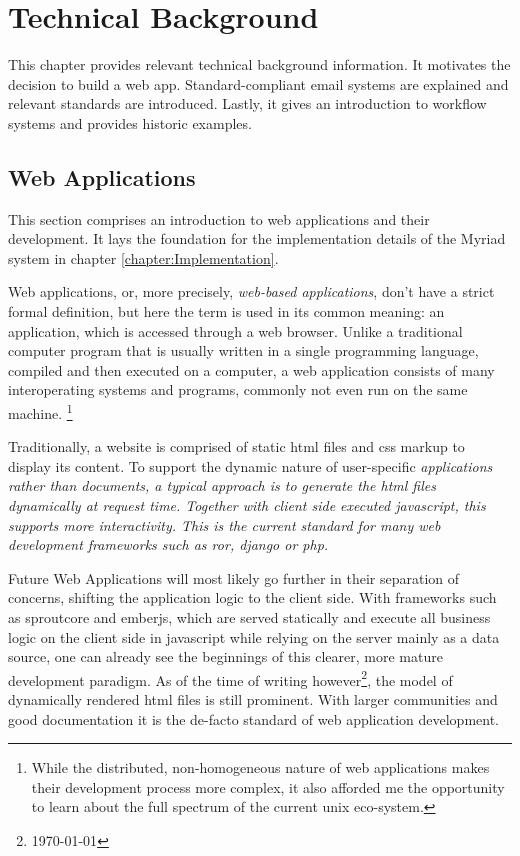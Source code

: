 \chapter{Technical Background}
\label{chapter:Technical}

This chapter provides relevant technical background information. It motivates the decision to build a web app. Standard-compliant email systems are explained and relevant standards are introduced. Lastly, it gives an introduction to workflow systems and provides historic examples.

\section{Web Applications}

This section comprises an introduction to web applications and their development. It lays the foundation for the implementation details of the Myriad system in chapter \autoref{chapter:Implementation}.

Web applications, or, more precisely, \emph{web-based applications}, don't have a strict formal definition, but here the term is used in its common meaning\cite{webapptrends}: an application, which is accessed through a web browser. Unlike a traditional computer program that is usually written in a single programming language, compiled and then executed on a computer, a web application consists of many interoperating systems and programs, commonly not even run on the same machine. \footnote{While the distributed, non-homogeneous nature of web applications makes their development process more complex, it also afforded me the opportunity to learn about the full spectrum of the current unix eco-system.}

Traditionally, a website is comprised of static \gls{html} files and \gls{css} markup to display its content. To support the dynamic nature of user-specific \em{applications} rather than \em{documents}, a typical approach is to generate the \gls{html} files dynamically at request time. Together with client side executed \gls{javascript}, this supports more interactivity. This is the current standard for many web development frameworks such as \gls{ror}, \gls{django} or \gls{php}.

Future Web Applications will most likely go further in their separation of concerns, shifting the application logic to the client side. With frameworks such as \gls{sproutcore} and \gls{emberjs}, which are served statically and execute all business logic on the client side in \gls{javascript} while relying on the server mainly as a data source, one can already see the beginnings of this clearer, more mature development paradigm. As of the time of writing however\footnote{ \today }, the model of dynamically rendered \gls{html} files is still prominent. With larger communities and good documentation it is the de-facto standard of web application development.

